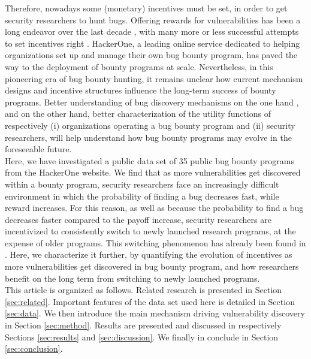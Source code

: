 Therefore, nowadays some (monetary) incentives must be set, in order to get security researchers to hunt bugs. Offering rewards for vulnerabilities has been a long endeavor over the last decade \cite{bohme2006comparison}, with many more or less successful attempts to set incentives right \cite{finifter2013empirical,zhao2014exploratory,zhao2015empirical}. HackerOne, a leading online service dedicated to helping organizations set up and manage their own bug bounty program, has paved the way to the deployment of bounty programs at scale. Nevertheless, in this pioneering era of bug bounty hunting, it remains unclear how current mechanism designs and incentive structures influence the long-term success of bounty programs. Better understanding of bug discovery mechanisms on the one hand \cite{zhao2016empirical}, and on the other hand, better characterization of the utility functions of respectively (i) organizations operating a bug bounty program and (ii) security researchers, will help understand how bug bounty programs may evolve in the foreseeable future.\\

Here, we have investigated a public data set of 35 public bug bounty programs from the HackerOne website. We find that as more vulnerabilities get discovered within a bounty program, security researchers face an increasingly difficult environment in which the probability of finding a bug decreases fast, while reward increases. For this reason, as well as because the probability to find a bug decreases faster compared to the payoff increase, security researchers are incentivized to consistently switch to newly launched research programs, at the expense of older programs. This switching phenomenon has already been found in \cite{zhao2015empirical}. Here, we characterize it further, by quantifying the evolution of incentives as more vulnerabilities get discovered in bug bounty program, and how researchers benefit on the long term from switching to newly launched programs.\\

This article is organized as follows. Related research is presented in Section \ref{sec:related}. Important features of the data set used here is detailed in Section \ref{sec:data}. We then introduce the main mechanism driving vulnerability discovery in Section \ref{sec:method}. Results are presented and discussed in respectively Sections \ref{sec:results} and \ref{sec:discussion}. We finally in conclude in Section \ref{sec:conclusion}.